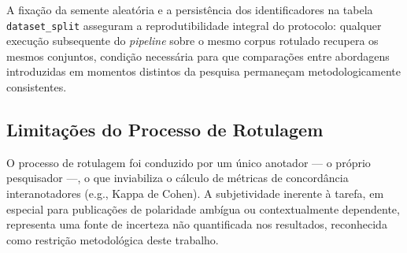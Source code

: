A fixação da semente aleatória e a persistência dos identificadores na tabela \texttt{dataset\_split} asseguram a reprodutibilidade integral do protocolo: qualquer execução subsequente do \textit{pipeline} sobre o mesmo corpus rotulado recupera os mesmos conjuntos, condição necessária para que comparações entre abordagens introduzidas em momentos distintos da pesquisa permaneçam metodologicamente consistentes.


\subsection{Limitações do Processo de Rotulagem}
\label{subsec:lim_rotulagem}

O processo de rotulagem foi conduzido por um único anotador — o próprio pesquisador —, o que inviabiliza o cálculo de métricas de concordância interanotadores (e.g., Kappa de Cohen). A subjetividade inerente à tarefa, em especial para publicações de polaridade ambígua ou contextualmente dependente, representa uma fonte de incerteza não quantificada nos resultados, reconhecida como restrição metodológica deste trabalho.
